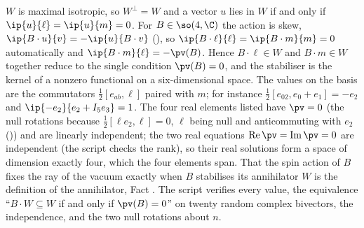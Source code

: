 $W$ is maximal isotropic, so $W^{\perp} = W$ and a vector $u$ lies in $W$ if and only if $\ip{u}{\ell} = \ip{u}{m} = 0$. For $B \in \so(4,\C)$ the action is skew, $\ip{B\cdot u}{v} = -\ip{u}{B\cdot v}$ (), so $\ip{B\cdot\ell}{\ell} = \ip{B\cdot m}{m} = 0$ automatically and $\ip{B\cdot m}{\ell} = -\pv(B)$. Hence $B\cdot\ell \in W$ and $B\cdot m \in W$ together reduce to the single condition $\pv(B) = 0$, and the stabiliser is the kernel of a nonzero functional on a six-dimensional space. The values on the basis are the commutators $\tfrac12[e_{ab}, \ell]$ paired with $m$; for instance $\tfrac12[e_{02}, e_{0} + e_{1}] = -e_{2}$ and $\ip{-e_{2}}{e_{2} + I_{5}e_{3}} = 1$. The four real elements listed have $\pv = 0$ (the null rotations because $\tfrac12[\ell e_{2}, \ell] = 0$, $\ell$ being null and anticommuting with $e_{2}$ ()) and are linearly independent; the two real equations $\operatorname{Re}\pv = \operatorname{Im}\pv = 0$ are independent (the script checks the rank), so their real solutions form a space of dimension exactly four, which the four elements span. That the spin action of $B$ fixes the ray of the vacuum exactly when $B$ stabilises its annihilator $W$ is the definition of the annihilator, Fact . The script verifies every value, the equivalence ``$B\cdot W \subseteq W$ if and only if $\pv(B) = 0$'' on twenty random complex bivectors, the independence, and the two null rotations about $n$.
